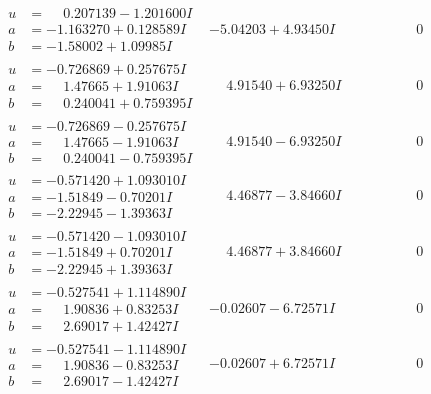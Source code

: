 \documentclass[1p]{elsarticle_modified}
\theoremstyle{definition}
\begin{document}
$$\begin{array}{c|c|c}
\begin{aligned}
u &= \phantom{-}0.207139 - 1.201600 I \\
a &= -1.163270 + 0.128589 I \\
b &= -1.58002 + 1.09985 I\end{aligned}
 & -5.04203 + 4.93450 I & \phantom{-0.000000 } 0 \\ \hline\begin{aligned}
u &= -0.726869 + 0.257675 I \\
a &= \phantom{-}1.47665 + 1.91063 I \\
b &= \phantom{-}0.240041 + 0.759395 I\end{aligned}
 & \phantom{-}4.91540 + 6.93250 I & \phantom{-0.000000 } 0 \\ \hline\begin{aligned}
u &= -0.726869 - 0.257675 I \\
a &= \phantom{-}1.47665 - 1.91063 I \\
b &= \phantom{-}0.240041 - 0.759395 I\end{aligned}
 & \phantom{-}4.91540 - 6.93250 I & \phantom{-0.000000 } 0 \\ \hline\begin{aligned}
u &= -0.571420 + 1.093010 I \\
a &= -1.51849 - 0.70201 I \\
b &= -2.22945 - 1.39363 I\end{aligned}
 & \phantom{-}4.46877 - 3.84660 I & \phantom{-0.000000 } 0 \\ \hline\begin{aligned}
u &= -0.571420 - 1.093010 I \\
a &= -1.51849 + 0.70201 I \\
b &= -2.22945 + 1.39363 I\end{aligned}
 & \phantom{-}4.46877 + 3.84660 I & \phantom{-0.000000 } 0 \\ \hline\begin{aligned}
u &= -0.527541 + 1.114890 I \\
a &= \phantom{-}1.90836 + 0.83253 I \\
b &= \phantom{-}2.69017 + 1.42427 I\end{aligned}
 & -0.02607 - 6.72571 I & \phantom{-0.000000 } 0 \\ \hline\begin{aligned}
u &= -0.527541 - 1.114890 I \\
a &= \phantom{-}1.90836 - 0.83253 I \\
b &= \phantom{-}2.69017 - 1.42427 I\end{aligned}
 & -0.02607 + 6.72571 I & \phantom{-0.000000 } 0 \\ \hline\begin{aligned}

\end{aligned}
\end{array}$$
\end{document}

